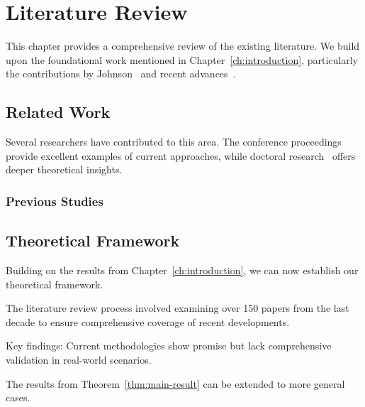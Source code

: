 \chapter{Literature Review}
\label{ch:literature-review}

This chapter provides a comprehensive review of the existing literature. We build upon the foundational work mentioned in Chapter~\ref{ch:introduction}, particularly the contributions by Johnson~\cite{textbook2022} and recent advances~\cite{sample2023}.

\lipsum[9-10]

\section{Related Work}
\label{sec:related-work}

Several researchers have contributed to this area. The conference proceedings~\cite{conference2023} provide excellent examples of current approaches, while doctoral research~\cite{thesis2022} offers deeper theoretical insights.

\lipsum[11-12]

\subsection{Previous Studies}
\label{subsec:previous-studies}

\lipsum[13]

\section{Theoretical Framework}
\label{sec:theoretical-framework}

Building on the results from Chapter~\ref{ch:introduction}, we can now establish our theoretical framework.

\begin{block}[note]
The literature review process involved examining over 150 papers from the last decade to ensure comprehensive coverage of recent developments.
\end{block}

\begin{block}[tldr]
Key findings: Current methodologies show promise but lack comprehensive validation in real-world scenarios.
\end{block}

\begin{theorem}
\label{thm:extension}
The results from Theorem~\ref{thm:main-result} can be extended to more general cases.
\end{theorem}

